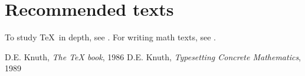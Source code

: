 \documentclass{article}
\begin{document}
\section*{Recommended texts} %
To study \TeX\ in depth, see \cite{DK86}. For writing math texts, see \cite{DK89}.

\begin{thebibliography}{8}
 D.E. Knuth, \emph{The {\TeX} book}, 1986
 D.E. Knuth, \emph{Typesetting Concrete Mathematics}, 1989
\end{thebibliography}
\end{document}
